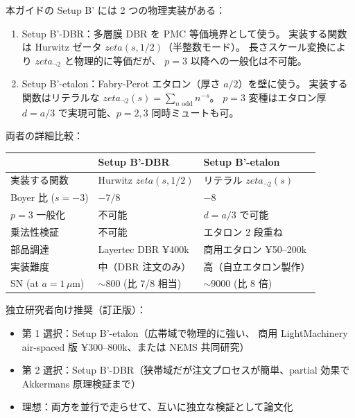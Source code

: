 \documentclass[11pt,a4paper]{article}
\def\zeta{zeta}%
\def\textbf#1{#1}%
\begin{document}
\textbf{本ガイドの Setup B' には 2 つの物理実装がある}：

\begin{enumerate}
\item \textbf{Setup B'-DBR}：多層膜 DBR を PMC 等価境界として使う。
  実装する関数は Hurwitz ゼータ $\zeta(s, 1/2)$（半整数モード）。
  長さスケール変換により $\zeta_{\neg 2}$ と物理的に等価だが、
  $p=3$ 以降への一般化は不可能。
\item \textbf{Setup B'-etalon}：Fabry-Perot エタロン（厚さ $a/2$）を壁に使う。
  実装する関数は\textbf{リテラルな} $\zeta_{\neg 2}(s) = \sum_{n \text{ odd}} n^{-s}$。
  $p=3$ 変種はエタロン厚 $d = a/3$ で実現可能、$p=2, 3$ 同時ミュートも可。
\end{enumerate}

両者の詳細比較：

\begin{center}
\begin{tabular}{p{}p{}p{}}
\toprule
& \textbf{Setup B'-DBR} & \textbf{Setup B'-etalon} \\
\midrule
実装する関数 & Hurwitz $\zeta(s, 1/2)$ & \textbf{リテラル $\zeta_{\neg 2}(s)$} \\
Boyer 比 ($s=-3$) & $-7/8$ & \textbf{$-8$} \\
$p=3$ 一般化 & 不可能 & \textbf{$d=a/3$ で可能} \\
乗法性検証 & 不可能 & \textbf{エタロン 2 段重ね} \\
部品調達 & Layertec DBR ¥400k & \textbf{商用エタロン ¥50--200k} \\
実装難度 & 中（DBR 注文のみ） & 高（自立エタロン製作） \\
SN (at $a=1\,\mu$m) & $\sim 800$ (比 7/8 相当) & \textbf{$\sim 9000$} (比 8 倍) \\
\bottomrule
\end{tabular}
\end{center}

\textbf{独立研究者向け推奨（訂正版）}：
\begin{itemize}
\item \textbf{第 1 選択：Setup B'-etalon}（広帯域で物理的に強い、
  商用 LightMachinery air-spaced 版 ¥300--800k、または NEMS 共同研究）
\item 第 2 選択：Setup B'-DBR（狭帯域だが注文プロセスが簡単、partial 効果で
  Akkermans 原理検証まで）
\item 理想：両方を並行で走らせて、互いに独立な検証として論文化
\end{itemize}
\end{document}
